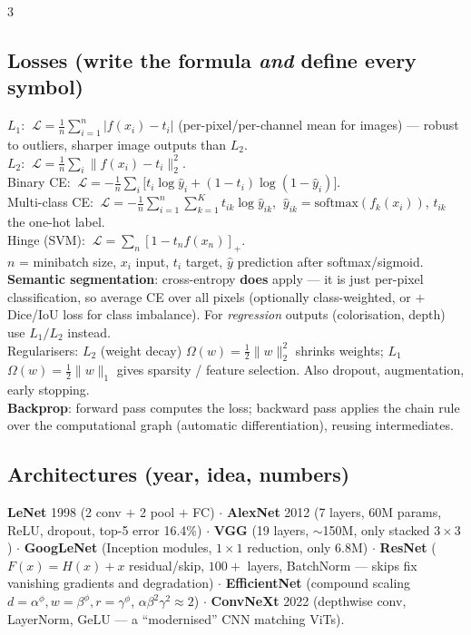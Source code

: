 \documentclass[9pt,a4paper,landscape]{extarticle}
\newcommand{\key}[1]{\textbf{#1}}
\begin{document}
\begin{multicols}{3}
\subsection{Losses (write the formula \emph{and} define every symbol)}
$L_1$: $\ \mathcal L=\frac1n\sum_{i=1}^{n}|f(x_i)-t_i|$ (per-pixel/per-channel mean for images) --- robust to outliers, sharper image outputs than $L_2$.\\
$L_2$: $\ \mathcal L=\frac1n\sum_i\|f(x_i)-t_i\|_2^2$.\\
Binary CE: $\ \mathcal L=-\frac1n\sum_i\big[t_i\log \hat y_i+(1-t_i)\log(1-\hat y_i)\big]$.\\
Multi-class CE: $\ \mathcal L=-\frac1n\sum_{i=1}^{n}\sum_{k=1}^{K}t_{ik}\log \hat y_{ik}$, $\ \hat y_{ik}=\mathrm{softmax}(f_k(x_i))$, $t_{ik}$ the one-hot label.\\
Hinge (SVM): $\ \mathcal L=\sum_n[1-t_n f(x_n)]_+$.\\
$n$ = minibatch size, $x_i$ input, $t_i$ target, $\hat y$ prediction after softmax/sigmoid.\\
\key{Semantic segmentation}: cross-entropy \key{does} apply --- it is just per-pixel classification, so average CE over all pixels (optionally class-weighted, or $+$ Dice/IoU loss for class imbalance). For \emph{regression} outputs (colorisation, depth) use $L_1/L_2$ instead.\\
Regularisers: $L_2$ (weight decay) $\Omega(w)=\frac12\|w\|_2^2$ shrinks weights; $L_1$ $\Omega(w)=\frac12\|w\|_1$ gives sparsity / feature selection. Also dropout, augmentation, early stopping.\\
\key{Backprop}: forward pass computes the loss; backward pass applies the chain rule over the computational graph (automatic differentiation), reusing intermediates.

\subsection{Architectures (year, idea, numbers)}
\key{LeNet} 1998 (2 conv $+$ 2 pool $+$ FC) $\cdot$ \key{AlexNet} 2012 (7 layers, 60M params, ReLU, dropout, top-5 error 16.4\%) $\cdot$ \key{VGG} (19 layers, $\sim$150M, only stacked $3\times3$) $\cdot$ \key{GoogLeNet} (Inception modules, $1\times1$ reduction, only 6.8M) $\cdot$ \key{ResNet} ($F(x)=H(x)+x$ residual/skip, $100+$ layers, BatchNorm --- skips fix vanishing gradients and degradation) $\cdot$ \key{EfficientNet} (compound scaling $d=\alpha^\phi,w=\beta^\phi,r=\gamma^\phi$, $\alpha\beta^2\gamma^2\approx2$) $\cdot$ \key{ConvNeXt} 2022 (depthwise conv, LayerNorm, GeLU --- a ``modernised'' CNN matching ViTs).


\end{multicols}
\end{document}
